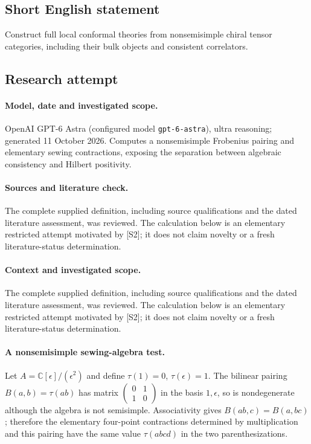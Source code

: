 \documentclass[11pt]{article}
\begin{document}
\subsection{Short English statement}
Construct full local conformal theories from nonsemisimple chiral tensor categories, including their bulk objects and consistent correlators.
\subsection{Research attempt}
\paragraph{Model, date and investigated scope.}
OpenAI GPT-6 Astra (configured model \texttt{gpt-6-astra}), ultra reasoning; generated 11 October 2026. Computes a nonsemisimple Frobenius pairing and elementary sewing contractions, exposing the separation between algebraic consistency and Hilbert positivity.

\paragraph{Sources and literature check.}
The complete supplied definition, including source qualifications and the dated literature assessment, was reviewed. The calculation below is an elementary restricted attempt motivated by [S2]; it does not claim novelty or a fresh literature-status determination.

\paragraph{Context and investigated scope.} The complete supplied definition, including source qualifications and the dated literature assessment, was reviewed. The calculation below is an elementary restricted attempt motivated by [S2]; it does not claim novelty or a fresh literature-status determination.

\paragraph{A nonsemisimple sewing-algebra test.} Let $A=\mathbb C[\epsilon]/(\epsilon^2)$ and define $\tau(1)=0$, $\tau(\epsilon)=1$. The bilinear pairing $B(a,b)=\tau(ab)$ has matrix $\left(\begin{smallmatrix}0&1\\1&0\end{smallmatrix}\right)$ in the basis $1,\epsilon$, so is nondegenerate although the algebra is not semisimple. Associativity gives $B(ab,c)=B(a,bc)$; therefore the elementary four-point contractions determined by multiplication and this pairing have the same value $\tau(abcd)$ in the two parenthesizations.
\end{document}
